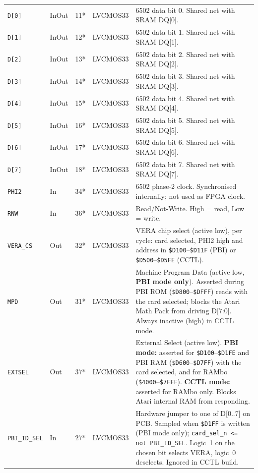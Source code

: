 \documentclass[11pt,a4paper]{article}
\newcommand{\sig}[1]{\texttt{#1}}
\newcommand{\hex}[1]{\texttt{\$#1}}
\begin{document}
\begin{center}
\begin{longtable}{llllp{5.5cm}}
\sig{D[0]}          & InOut & 11* & LVCMOS33 &
    6502 data bit 0. Shared net with SRAM DQ[0]. \\
\sig{D[1]}          & InOut & 12* & LVCMOS33 &
    6502 data bit 1. Shared net with SRAM DQ[1]. \\
\sig{D[2]}          & InOut & 13* & LVCMOS33 &
    6502 data bit 2. Shared net with SRAM DQ[2]. \\
\sig{D[3]}          & InOut & 14* & LVCMOS33 &
    6502 data bit 3. Shared net with SRAM DQ[3]. \\
\sig{D[4]}          & InOut & 15* & LVCMOS33 &
    6502 data bit 4. Shared net with SRAM DQ[4]. \\
\sig{D[5]}          & InOut & 16* & LVCMOS33 &
    6502 data bit 5. Shared net with SRAM DQ[5]. \\
\sig{D[6]}          & InOut & 17* & LVCMOS33 &
    6502 data bit 6. Shared net with SRAM DQ[6]. \\
\sig{D[7]}          & InOut & 18* & LVCMOS33 &
    6502 data bit 7. Shared net with SRAM DQ[7]. \\[2pt]

\sig{PHI2}          & In    & 34* & LVCMOS33 &
    6502 phase-2 clock. Synchronised internally; not used as FPGA clock. \\
\sig{RNW}           & In    & 36* & LVCMOS33 &
    Read/Not-Write. High = read, Low = write. \\[2pt]

\sig{VERA\_CS}      & Out   & 32* & LVCMOS33 &
    VERA chip select (active low), per cycle: card selected, PHI2 high
    and address in \hex{D100}--\hex{D11F} (PBI) or \hex{D500}--\hex{D5FE}
    (CCTL). \\
\sig{MPD}           & Out   & 31* & LVCMOS33 &
    Machine Program Data (active low, \textbf{PBI mode only}).
    Asserted during PBI ROM (\hex{D800}--\hex{DFFF}) reads with the card
    selected; blocks the Atari Math Pack from driving D[7:0].  Always
    inactive (high) in CCTL mode. \\
\sig{EXTSEL}        & Out   & 37* & LVCMOS33 &
    External Select (active low).  \textbf{PBI mode:} asserted for
    \hex{D100}--\hex{D1FE} and PBI RAM (\hex{D600}--\hex{D7FF}) with the
    card selected, and for RAMbo (\hex{4000}--\hex{7FFF}).
    \textbf{CCTL mode:} asserted for RAMbo only.  Blocks Atari
    internal RAM from responding. \\[2pt]

\sig{PBI\_ID\_SEL}  & In    & 27* & LVCMOS33 &
    Hardware jumper to one of D[0..7] on PCB.  Sampled when \hex{D1FF}
    is written (PBI mode only); \texttt{card\_sel\_n <= not PBI\_ID\_SEL}.
    Logic~1 on the chosen bit selects VERA, logic~0 deselects.
    Ignored in CCTL build. \\[2pt]


\end{longtable}
\end{center}
\end{document}
